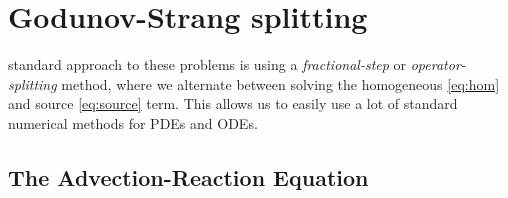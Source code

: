 \documentclass[journal,onecolumn]{IEEEtran}
\begin{document}
%






\section{Godunov-Strang splitting}

 standard approach to these problems is using a \textit{fractional-step} or \textit{operator-splitting} method, where we alternate between solving the homogeneous \eqref{eq:hom} and source \eqref{eq:source} term. This allows us to easily use a lot of standard numerical methods for PDEs and ODEs.

\subsection{The Advection-Reaction Equation}
\end{document}
